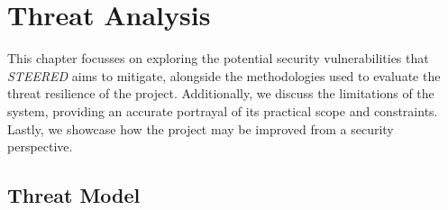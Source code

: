 \chapter{Threat Analysis}
\label{cha:ta}

This chapter focusses on exploring the potential security vulnerabilities that
\textit{STEERED} aims to mitigate, alongside the methodologies used to evaluate
the threat resilience of the project. Additionally, we discuss the limitations
of the system, providing an accurate portrayal of its practical scope and constraints.
Lastly, we showcase how the project may be improved from a security perspective.

\section{Threat Model}
\label{sec:ta_model}

